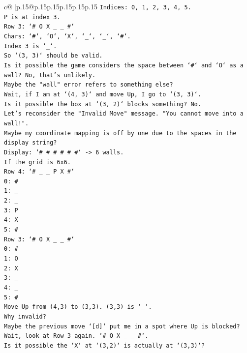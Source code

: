 \documentclass{article}
\begin{document}
{\begin{supertabular}{c@{$\;$}|p{.15\linewidth}@{}p{.15\linewidth}p{.15\linewidth}p{.15\linewidth}p{.15\linewidth}p{.15\linewidth}}
{{{\texttt{Indices: 0, 1, 2, 3, 4, 5.} \\
\texttt{P is at index 3.} \\
\texttt{Row 3: `\# O X \_ \_ \#`} \\
\texttt{Chars: `\#`, `O`, `X`, `\_`, `\_`, `\#`.} \\
\texttt{Index 3 is `\_`.} \\
\texttt{So `(3, 3)` should be valid.} \\
\texttt{Is it possible the game considers the space between `\#` and `O` as a wall? No, that's unlikely.} \\
\texttt{Maybe the "wall" error refers to something else?} \\
\texttt{Wait, if I am at `(4, 3)` and move Up, I go to `(3, 3)`.} \\
\texttt{Is it possible the box at `(3, 2)` blocks something? No.} \\
\texttt{Let's reconsider the "Invalid Move" message. "You cannot move into a wall!".} \\
\texttt{Maybe my coordinate mapping is off by one due to the spaces in the display string?} \\
\texttt{Display: `\# \# \# \# \# \#` {-}> 6 walls.} \\
\texttt{If the grid is 6x6.} \\
\texttt{Row 4: `\# \_ \_ P X \#`} \\
\texttt{0: \#} \\
\texttt{1: \_} \\
\texttt{2: \_} \\
\texttt{3: P} \\
\texttt{4: X} \\
\texttt{5: \#} \\
\texttt{Row 3: `\# O X \_ \_ \#`} \\
\texttt{0: \#} \\
\texttt{1: O} \\
\texttt{2: X} \\
\texttt{3: \_} \\
\texttt{4: \_} \\
\texttt{5: \#} \\
\texttt{Move Up from (4,3) to (3,3). (3,3) is `\_`.} \\
\texttt{Why invalid?} \\
\texttt{Maybe the previous move `{[}d{]}` put me in a spot where Up is blocked?} \\
\texttt{Wait, look at Row 3 again. `\# O X \_ \_ \#`.} \\
\texttt{Is it possible the `X` at `(3,2)` is actually at `(3,3)`?} \\
}}}
\end{supertabular}}
\end{document}
